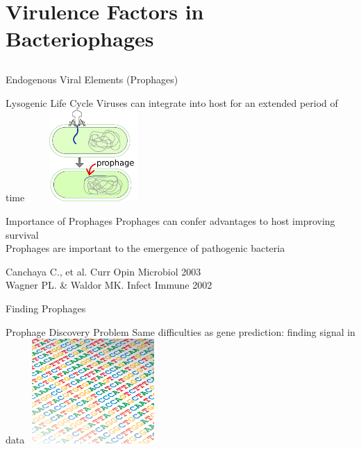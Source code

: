 \documentclass[11pt]{beamer}
\begin{document}
	

\section{Virulence Factors in Bacteriophages}
\subsection{}
	
	\begin{frame}{Endogenous Viral Elements (Prophages)}
	\begin{block}{Lysogenic Life Cycle}
	Viruses can integrate into host for an extended period of time
	\center
	\vspace{-0.2cm}
	\includegraphics[height=3.5cm, width=5cm]{prophage.png}
	\end{block}
	\begin{block}{Importance of Prophages}
	Prophages can confer advantages to host improving survival \\ 
	Prophages are important to the emergence of pathogenic bacteria
	\end{block}
	
	\tiny{Canchaya C., et al. Curr Opin Microbiol 2003 \\ Wagner PL. \& Waldor MK. Infect Immune 2002}
	\end{frame}

	\begin{frame}{Finding Prophages}
	\begin{block}{Prophage Discovery Problem}
	Same difficulties as gene prediction: finding signal in data
	\center
	\includegraphics[height=4cm, width=5cm]{dna.png}
	\end{block}
	\end{frame}
	
\end{document}
